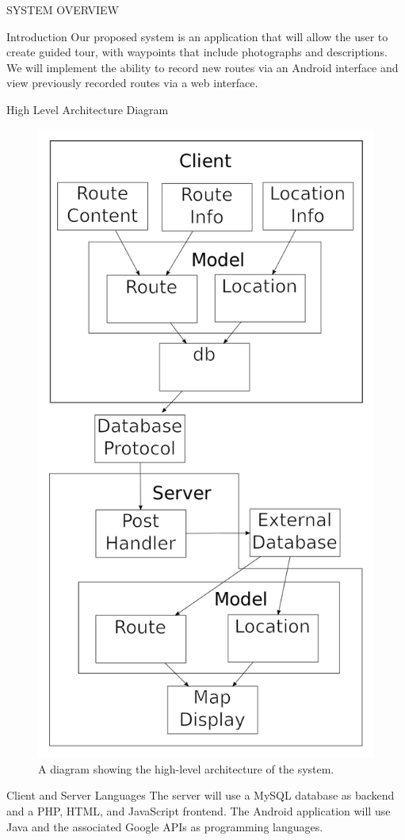 \documentclass{article}
\begin{document}
	\newpage
	\begin{section}{SYSTEM OVERVIEW}
		\begin{subsection}{Introduction}
			Our proposed system is an application that will allow the user to create guided tour, with waypoints that include photographs and descriptions. We will implement the ability to record new routes via an Android interface and view previously recorded routes via a web interface.
		\end{subsection}
		
		
		\begin{subsection}{High Level Architecture Diagram}
			\begin{figure}[h!]
				\begin{center}
					\includegraphics[height=\columnwidth]{../Diagrams/HighLevelArchitecture/HighLevelArchitecture.png}
				\end{center}
				\caption{A diagram showing the high-level architecture of the system.}
			\end{figure}
		\end{subsection}
				
		\clearpage
		\begin{subsection}{Client and Server Languages}
			The server will use a MySQL database as backend and a PHP, HTML, and JavaScript frontend. The Android application will use Java and the associated Google APIs as programming languages.
		\end{subsection}
	\end{section}
	
\end{document}
